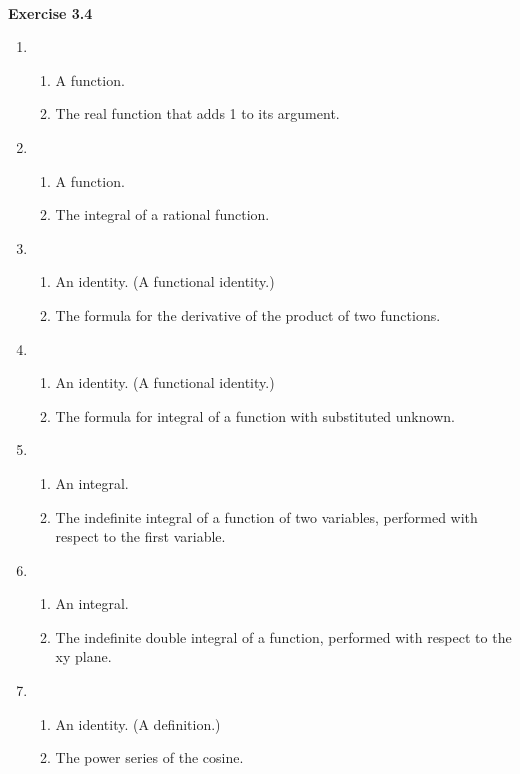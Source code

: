 \documentclass{article}
\begin{document}
\text{}\\
\textbf{\large\color{blue} Exercise 3.4}

\begin{enumerate}
	\item 
	\begin{enumerate}[label=\roman*]
		\item  A function.
		\item The real function that adds 1 to its argument.
	\end{enumerate}
	\item 
\begin{enumerate}[label=\roman*]
	\item  A function.
	\item The integral of a rational function.
\end{enumerate}
	\item 
\begin{enumerate}[label=\roman*]
	\item  An identity. (A functional identity.)
	\item  The formula for the derivative of the product of two functions.
\end{enumerate}
	\item 
\begin{enumerate}[label=\roman*]
	\item  An identity. (A functional identity.)
	\item  The formula for integral of a function with substituted unknown.
\end{enumerate}
	\item 
\begin{enumerate}[label=\roman*]
	\item  An integral.
	\item  The indefinite integral of a function of two variables, performed with respect to the first variable.
\end{enumerate}
	\item 
\begin{enumerate}[label=\roman*]
	\item  An integral.
	\item  The indefinite double integral of a function, performed with respect to the xy plane.
\end{enumerate}
	\item 
\begin{enumerate}[label=\roman*]
	\item  An identity. (A definition.)
	\item  The power series of the cosine.

\end{enumerate}
\end{enumerate}
\end{document}
